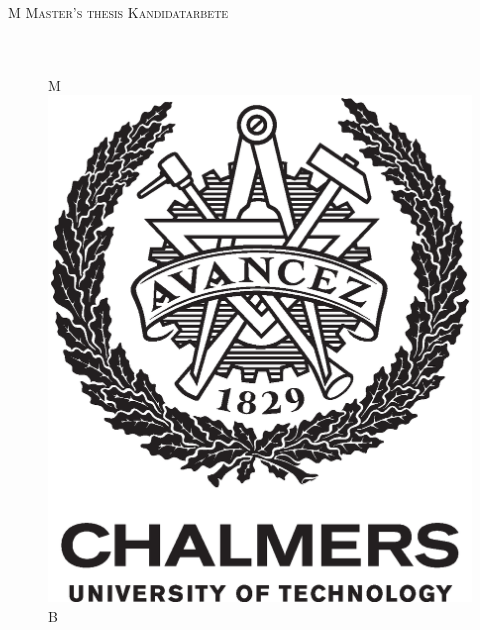 { %
\newpage
\thispagestyle{empty}
\begin{center}
	\textsc{\large
	\if\thesisType M
	    Master's thesis
	\else
	    Kandidatarbete
	\fi
	\thesisYear
	}\\[4cm]
	\textbf{\Large \thesisTitle} \\[1cm]
	{\large \thesisSubtitle}\\[1cm]
	{\large \thesisAuthor}

	\vfill
	\begin{figure}[H]
	\centering
	\if\thesisType M
    \includegraphics[width=0.2\pdfpagewidth]{template/figures/AvancezChalmersU_black_centered.eps} \\
    \fi
    \if\thesisType B

\end{figure}
\end{center}}
